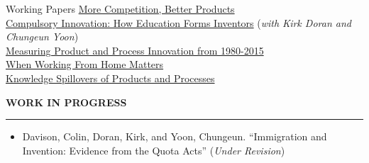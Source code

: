 \documentclass{resume} %
\begin{document}
\begin{rSection}{Working Papers}
\href{https://colindavison.github.io/working_papers/more/more_competition.pdf}{More Competition, Better Products} \\
\href{https://colindavison.github.io/working_papers/compulsory_innovation/compulsory_innovation.pdf}{Compulsory Innovation: How Education Forms Inventors} (\textit{with Kirk Doran and Chungeun Yoon})\\
\href{https://colindavison.github.io/working_papers/measuring/measuring_product_process.pdf}{Measuring Product and Process Innovation from
1980-2015} \\
\href{https://colindavison.github.io/working_papers/wfh/when_working.pdf}{When Working From Home Matters} \\
\href{https://colindavison.github.io/working_papers/knowledge/knowledge_spillovers.pdf}{Knowledge Spillovers of Products and Processes} 
\end{rSection}	


\sectionskip
\MakeUppercase{\textbf{Work in Progress}}
\sectionlineskip
\hrule
\begin{itemize}[leftmargin=1.5em]
\setlength\itemsep{-0.2em}
	\item [] Davison, Colin, Doran, Kirk, and Yoon, Chungeun. ``Immigration and Invention: Evidence from the Quota Acts'' (\textit{Under Revision}) 
\end{itemize}

	
\end{document}
